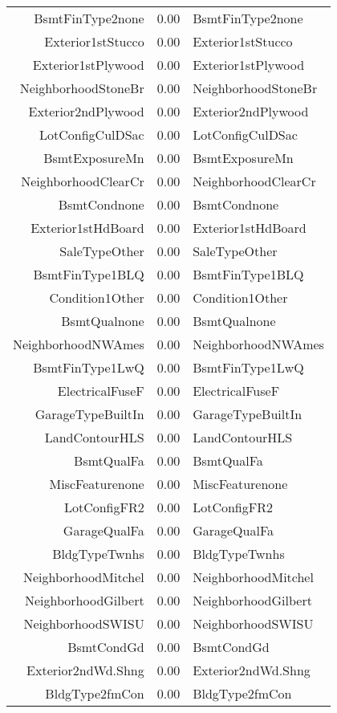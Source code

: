 \begin{table}[ht]
\begin{tabular}{rrl}
  BsmtFinType2none & 0.00 & BsmtFinType2none \\ 
  Exterior1stStucco & 0.00 & Exterior1stStucco \\ 
  Exterior1stPlywood & 0.00 & Exterior1stPlywood \\ 
  NeighborhoodStoneBr & 0.00 & NeighborhoodStoneBr \\ 
  Exterior2ndPlywood & 0.00 & Exterior2ndPlywood \\ 
  LotConfigCulDSac & 0.00 & LotConfigCulDSac \\ 
  BsmtExposureMn & 0.00 & BsmtExposureMn \\ 
  NeighborhoodClearCr & 0.00 & NeighborhoodClearCr \\ 
  BsmtCondnone & 0.00 & BsmtCondnone \\ 
  Exterior1stHdBoard & 0.00 & Exterior1stHdBoard \\ 
  SaleTypeOther & 0.00 & SaleTypeOther \\ 
  BsmtFinType1BLQ & 0.00 & BsmtFinType1BLQ \\ 
  Condition1Other & 0.00 & Condition1Other \\ 
  BsmtQualnone & 0.00 & BsmtQualnone \\ 
  NeighborhoodNWAmes & 0.00 & NeighborhoodNWAmes \\ 
  BsmtFinType1LwQ & 0.00 & BsmtFinType1LwQ \\ 
  ElectricalFuseF & 0.00 & ElectricalFuseF \\ 
  GarageTypeBuiltIn & 0.00 & GarageTypeBuiltIn \\ 
  LandContourHLS & 0.00 & LandContourHLS \\ 
  BsmtQualFa & 0.00 & BsmtQualFa \\ 
  MiscFeaturenone & 0.00 & MiscFeaturenone \\ 
  LotConfigFR2 & 0.00 & LotConfigFR2 \\ 
  GarageQualFa & 0.00 & GarageQualFa \\ 
  BldgTypeTwnhs & 0.00 & BldgTypeTwnhs \\ 
  NeighborhoodMitchel & 0.00 & NeighborhoodMitchel \\ 
  NeighborhoodGilbert & 0.00 & NeighborhoodGilbert \\ 
  NeighborhoodSWISU & 0.00 & NeighborhoodSWISU \\ 
  BsmtCondGd & 0.00 & BsmtCondGd \\ 
  Exterior2ndWd.Shng & 0.00 & Exterior2ndWd.Shng \\ 
  BldgType2fmCon & 0.00 & BldgType2fmCon \\ 

\end{tabular}
\end{table}
